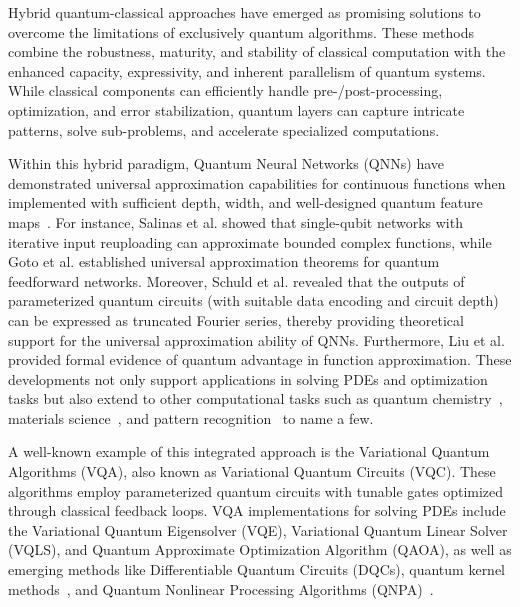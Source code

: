 Hybrid quantum-classical approaches have emerged as promising solutions to overcome the limitations of exclusively quantum algorithms. These methods combine the robustness, maturity, and stability of classical computation with the enhanced capacity, expressivity, and inherent parallelism of quantum systems. While classical components can efficiently handle pre-/post-processing, optimization, and error stabilization, quantum layers can capture intricate patterns, solve sub-problems, and accelerate specialized computations.

Within this hybrid paradigm, Quantum Neural Networks (QNNs) have demonstrated universal approximation capabilities for continuous functions when implemented with sufficient depth, width, and well-designed quantum feature maps~\cite{schuld2019quantum, lloyd2020quantum, beer2020training}. For instance, Salinas et al.\cite{PhysRevA.104.012405} showed that single-qubit networks with iterative input reuploading can approximate bounded complex functions, while Goto et al.\cite{goto2021universal} established universal approximation theorems for quantum feedforward networks. Moreover, Schuld et al.\cite{schuld2021effect} revealed that the outputs of parameterized quantum circuits (with suitable data encoding and circuit depth) can be expressed as truncated Fourier series, thereby providing theoretical support for the universal approximation ability of QNNs. Furthermore,  Liu et al.\cite{liu2021rigorous} provided formal evidence of quantum advantage in function approximation. These developments not only support applications in solving PDEs and optimization tasks but also extend to other computational tasks such as quantum chemistry~\cite{cao2019quantum}, materials science~\cite{bauer2020quantum, nachman2021quantum}, and pattern recognition~\cite{trugenberger2002quantum} to name a few.

A well-known example of this integrated approach is the Variational Quantum Algorithms (VQA), also known as Variational Quantum Circuits (VQC). These algorithms employ parameterized quantum circuits with tunable gates optimized through classical feedback loops. VQA implementations for solving PDEs include the Variational Quantum Eigensolver (VQE)\cite{peruzzo2014variational,mcclean2016theory}, Variational Quantum Linear Solver (VQLS)\cite{bravo2023variational}, and Quantum Approximate Optimization Algorithm (QAOA)\cite{albino2022solving}, as well as emerging methods like Differentiable Quantum Circuits (DQCs)\cite{kyriienko2021solving,bultrini2023mixed}, quantum kernel methods~\cite{paine2023quantum}, and Quantum Nonlinear Processing Algorithms (QNPA)~\cite{lubasch2020variational}. 


